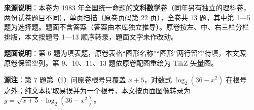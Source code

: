 

\begin{gktip}
\textbf{来源说明}：本卷为 1983 年全国统一命题的\textbf{文科数学}卷（同年另有独立的理科卷，两份试卷题目不同），单页扫描（原卷页码第 22 页），全卷共 13 题，其中第 1—5 题为选择题。题面不含答案（答案由本库独立推导）。原卷按左、中、右三栏分栏排版，本文按题号 1—13 顺序转录，题面文字未作改动。

\textbf{题面说明}：第 6 题为填表题，原卷表格“图形名称”“图形”两行留空待填，本文照原卷保留空列。第 9、10、11、13 题依原卷配图重绘为 TikZ 矢量图。

\textbf{源注}：第 7 题第（1）问原卷根号只覆盖 $x+5$，对数式 $\log_2(36-x^2)$ 在根号之外；纯文本提取易误并为一个根号，本文按页面图像转录为 $y=\sqrt{x+5}\cdot\log_2(36-x^2)$。
\end{gktip}

